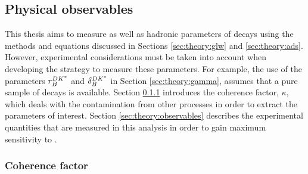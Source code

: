 \subsection{Physical observables}

This thesis aims to measure \Pgamma as well as hadronic parameters of \btodkst decays using the methods and equations discussed in Sections \ref{sec:theory:glw} and \ref{sec:theory:ads}. However, experimental considerations must be taken into account when developing the strategy to measure these parameters. For example, the use of the parameters $r_B^{DK^*}$ and $\delta_B^{DK^*}$ in Section \ref{sec:theory:gamma}, assumes that a pure sample of \btodkst decays is available. Section \ref{sec:theory:kappa} introduces the coherence factor, $\kappa$, which deals with the contamination from other \decay{\Bm}{\D\KS\pim} processes in order to extract the parameters of interest. Section \ref{sec:theory:observables} describes the experimental quantities that are measured in this analysis in order to gain maximum sensitivity to \Pgamma. 

\subsubsection{Coherence factor}
\label{sec:theory:kappa}

